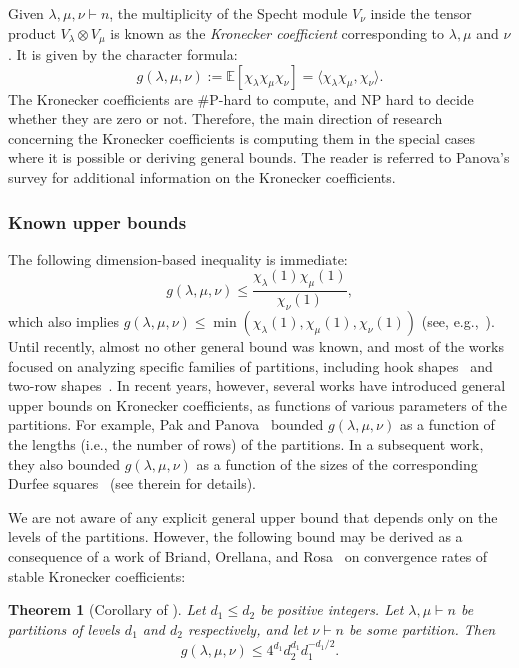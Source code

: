 \documentclass[11pt, letterpaper]{amsart}
\newtheorem{thm}{Theorem}[section]
\renewcommand\le{\leqslant}
\begin{document}
Given $\lambda, \mu,\nu \vdash n$, the multiplicity of the Specht module $V_{\nu}$ inside the tensor product $V_{\lambda}\otimes V_{\mu}$ is known as the \emph{Kronecker coefficient} corresponding to $\lambda,\mu$ and $\nu$. It is given by the character formula: 
\[ g(\lambda ,\mu, \nu):=\mathbb{E}[\chi_{\lambda}\chi_{\mu}\chi_{\nu}] = \langle \chi_{\lambda}\chi_{\mu}, \chi_{\nu}\rangle. \]  
The Kronecker coefficients are $\#\text{P}$-hard to compute, and $\text{NP}$ hard to decide whether they are zero or not. Therefore, the main direction of research concerning the Kronecker coefficients is computing them in the special cases where it is possible or deriving general bounds. The reader is referred to Panova's survey \cite{panova2023complexity} for additional information on the Kronecker coefficients.%

\subsubsection*{Known upper bounds}
The following dimension-based inequality is immediate:
\begin{equation}\label{eqn:trivial kronecker bound}
    g(\lambda, \mu, \nu) \le \frac{\chi_{\lambda}(1)\chi_{\mu}(1)}{\chi_{\nu}(1)},
\end{equation}
which also implies $g(\lambda, \mu, \nu) \le \min(\chi_{\lambda}(1),\chi_{\mu}(1),\chi_{\nu}(1))$ (see, e.g.,~\cite{pak2019largest}). Until recently, almost no other general bound was known, and most of the works focused on analyzing specific families of partitions, including hook shapes~\cite{remmel1989formula, ballantine2005combinatorial} and two-row shapes~\cite{remmel1994kronecker, rosas2001kronecker}. In recent years, however, several works have introduced general upper bounds on Kronecker coefficients, as functions of various parameters of the partitions. For example, Pak and Panova~\cite{pak2020bounds} bounded $g(\lambda, \mu, \nu)$ as a function of the lengths (i.e., the number of rows) of the partitions. In a subsequent work, they also bounded $g(\lambda, \mu, \nu)$ as a function of the sizes of the corresponding Durfee squares~\cite{pak2023durfee} (see therein for details).

We are not aware of any explicit general upper bound that depends only on the levels of the partitions. However, the following bound may be derived as a consequence of a work of Briand, Orellana, and Rosa~\cite{briand2011stability} on convergence rates of stable Kronecker coefficients:
\begin{thm}[Corollary of \cite{briand2011stability}] \label{thm:known kronecker bound}
Let $d_1\le d_2$ be positive integers. Let $\lambda,\mu \vdash n$ be partitions of levels $d_1$ and $d_2$ respectively, and let $\nu \vdash n$ be some partition. Then
\[
    g(\lambda, \mu, \nu) \le 4^{d_1} d_{2}^{d_{1}}d_{1}^{-d_{1}/2}.
\]
\end{thm}
\end{document}
